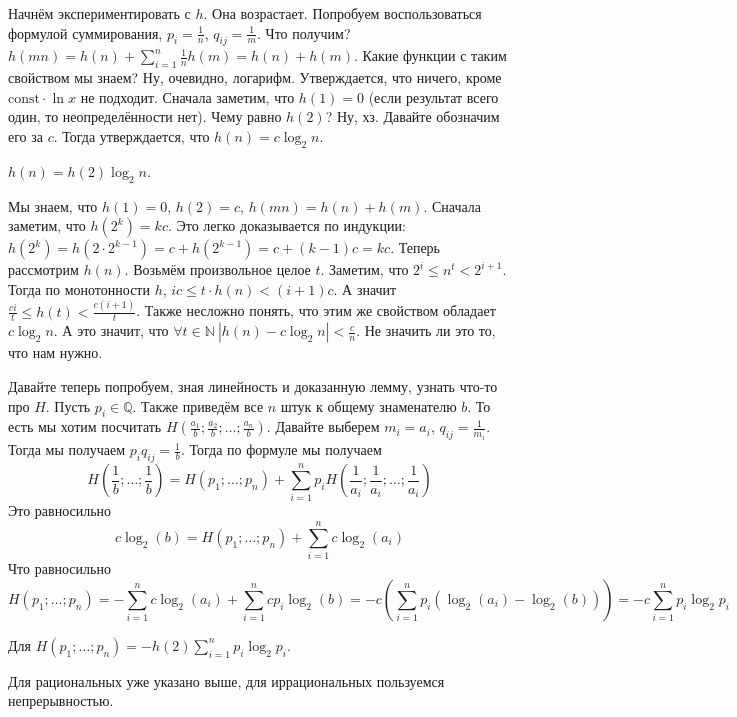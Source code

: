 \documentclass{article}
\begin{document}
\begin{itemize}
\begin{Comment}
            Начнём экспериментировать с $h$. Она возрастает. Попробуем воспользоваться формулой суммирования, $p_i=\frac1n$, $q_{ij}=\frac1m$. Что получим? $h(mn)=h(n)+\sum\limits_{i=1}^n\frac1n h(m)=h(n)+h(m)$. Какие функции с таким свойством мы знаем? Ну, очевидно, логарифм. Утверждается, что ничего, кроме $\mathrm{const}\cdot\ln x$ не подходит. Сначала заметим, что $h(1)=0$ (если результат всего один, то неопределённости нет). Чему равно $h(2)$? Ну, хз. Давайте обозначим его за $c$. Тогда утверждается, что $h(n)=c\log_2n$.
        \end{Comment}
        \thm $h(n)=h(2)\log_2n$.
        \begin{Proof}
            Мы знаем, что $h(1)=0$, $h(2)=c$, $h(mn)=h(n)+h(m)$. Сначала заметим, что $h(2^k)=kc$. Это легко доказывается по индукции: $h(2^k)=h(2\cdot2^{k-1})=c+h(2^{k-1})=c+(k-1)c=kc$. Теперь рассмотрим $h(n)$. Возьмём произвольное целое $t$. Заметим, что $2^i\leqslant n^t<2^{i+1}$. Тогда по монотонности $h$, $ic\leqslant t\cdot h(n)<(i+1)c$. А значит $\frac{ci}t\leqslant h(t)<\frac{c(i+1)}t$. Также несложно понять, что этим же свойством обладает $c\log_2n$. А это значит, что $\forall t\in\mathbb N~|h(n)-c\log_2n|<\frac cn$. Не значить ли это то, что нам нужно.
        \end{Proof}
        \begin{Comment}
            Давайте теперь попробуем, зная линейность и доказанную лемму, узнать что-то про $H$. Пусть $p_i\in\mathbb Q$. Также приведём все $n$ штук к общему знаменателю $b$. То есть мы хотим посчитать $H\left(\frac{a_1}b;\frac{a_2}b;\ldots;\frac{a_n}b\right)$. Давайте выберем $m_i=a_i$, $q_{ij}=\frac1{m_i}$. Тогда мы получаем $p_iq_{ij}=\frac1b$. Тогда по формуле мы получаем
            $$
            H(\frac1b;\ldots;\frac1b)=H(p_1;\ldots;p_n)+\sum\limits_{i=1}^np_iH(\frac1{a_i};\frac1{a_i};\ldots;\frac1{a_i})
            $$
            Это равносильно
            $$
            c\log_2(b)=H(p_1;\ldots;p_n)+\sum\limits_{i=1}^n c\log_2(a_i)
            $$
            Что равносильно
            $$
            H(p_1;\ldots;p_n)=-\sum\limits_{i=1}^n c\log_2(a_i)+\sum_{i=1}^ncp_i\log_2(b)=-c\left(\sum\limits_{i=1}^n p_i(\log_2(a_i)-\log_2(b))\right)=-c\sum\limits_{i=1}^np_i\log_2p_i
            $$
        \end{Comment}
        \thm Для $H(p_1;\ldots;p_n)=-h(2)\sum\limits_{i=1}^np_i\log_2p_i$.
        \begin{Proof}
            Для рациональных уже указано выше, для иррациональных пользуемся непрерывностью.
        \end{Proof}

\end{itemize}
\end{document}
